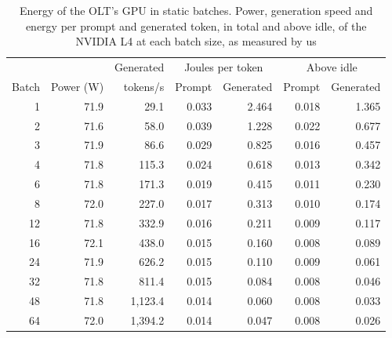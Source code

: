 \documentclass[cic,dipl,english]{infufrgs}
\begin{document}
\begin{table}[htb]
  \centering
  \caption[Energy of the OLT's GPU in static batches]{Energy of the OLT's GPU in static batches.
  Power, generation speed and energy per prompt and generated token, in total and above idle, of the NVIDIA L4 at each batch size, as measured by us}
  \label{tab:olt-sweep}
  \begin{tabular}{rrrrrrr}
    \toprule
    & & Generated & \multicolumn{2}{c}{Joules per token} & \multicolumn{2}{c}{Above idle} \\
    Batch & Power (W) & tokens/s & Prompt & Generated & Prompt & Generated \\
    \midrule
    1 & 71.9 & 29.1 & 0.033 & 2.464 & 0.018 & 1.365 \\
    2 & 71.6 & 58.0 & 0.039 & 1.228 & 0.022 & 0.677 \\
    3 & 71.9 & 86.6 & 0.029 & 0.825 & 0.016 & 0.457 \\
    4 & 71.8 & 115.3 & 0.024 & 0.618 & 0.013 & 0.342 \\
    6 & 71.8 & 171.3 & 0.019 & 0.415 & 0.011 & 0.230 \\
    8 & 72.0 & 227.0 & 0.017 & 0.313 & 0.010 & 0.174 \\
    12 & 71.8 & 332.9 & 0.016 & 0.211 & 0.009 & 0.117 \\
    16 & 72.1 & 438.0 & 0.015 & 0.160 & 0.008 & 0.089 \\
    24 & 71.9 & 626.2 & 0.015 & 0.110 & 0.009 & 0.061 \\
    32 & 71.8 & 811.4 & 0.015 & 0.084 & 0.008 & 0.046 \\
    48 & 71.8 & 1{,}123.4 & 0.014 & 0.060 & 0.008 & 0.033 \\
    64 & 72.0 & 1{,}394.2 & 0.014 & 0.047 & 0.008 & 0.026 \\
    \bottomrule
  \end{tabular}
\end{table}
\end{document}
